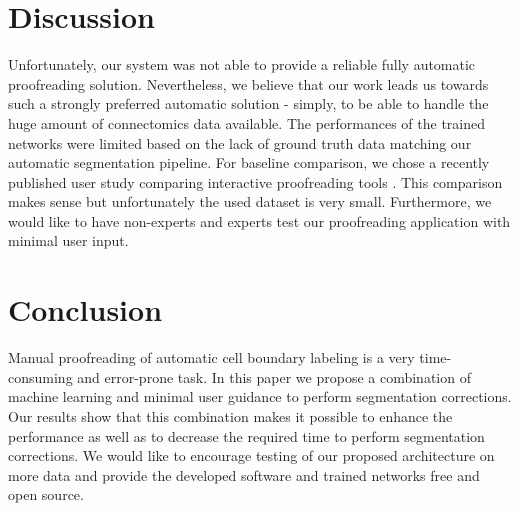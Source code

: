 \section{Discussion}

Unfortunately, our system was not able to provide a reliable fully automatic proofreading solution. Nevertheless, we believe that our work leads us towards such a strongly preferred automatic solution - simply, to be able to handle the huge amount of connectomics data available. The performances of the trained networks were limited based on the lack of ground truth data matching our automatic segmentation pipeline. For baseline comparison, we chose a recently published user study comparing interactive proofreading tools \cite{haehn_dojo_2014}. This comparison makes sense but unfortunately the used dataset is very small. Furthermore, we would like to have non-experts and experts test our proofreading application with minimal user input.

\section{Conclusion}

Manual proofreading of automatic cell boundary labeling is a very time-consuming and error-prone task. In this paper we propose a combination of machine learning and minimal user guidance to perform segmentation corrections. Our results show that this combination makes it possible to enhance the performance as well as to decrease the required time to perform segmentation corrections. We would like to encourage testing of our proposed architecture on more data and provide the developed software and trained networks free and open source.%